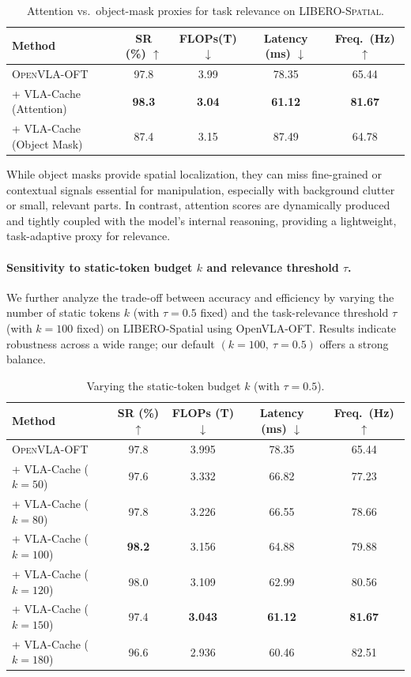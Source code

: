 \begin{table}[h]
\centering
\setlength{\tabcolsep}{8pt}
\begin{tabular}{lcccc}
\toprule
Method & SR (\%) $\uparrow$ & FLOPs(T) $\downarrow$ & Latency (ms) $\downarrow$ & Freq.\ (Hz) $\uparrow$ \\
\midrule
\textsc{OpenVLA-OFT} & 97.8 & 3.99 & 78.35 & 65.44 \\
\quad + VLA-Cache (Attention) & \textbf{98.3} & \textbf{3.04} & \textbf{61.12} & \textbf{81.67} \\
\quad + VLA-Cache (Object Mask) & 87.4 & 3.15 & 87.49 & 64.78 \\
\bottomrule
\end{tabular}   
\caption{Attention vs.\ object-mask proxies for task relevance on \textsc{LIBERO-Spatial}.}
\label{tab:attn_vs_mask}
\end{table}

While object masks provide spatial localization, they can miss fine-grained or contextual signals essential for manipulation, especially with background clutter or small, relevant parts. In contrast, attention scores are dynamically produced and tightly coupled with the model’s internal reasoning, providing a lightweight, task-adaptive proxy for relevance.

\paragraph{Sensitivity to static-token budget $k$ and relevance threshold $\tau$.}
We further analyze the trade-off between accuracy and efficiency by varying the number of static tokens $k$ (with $\tau{=}0.5$ fixed) and the task-relevance threshold $\tau$ (with $k{=}100$ fixed) on LIBERO-Spatial using OpenVLA-OFT. Results indicate robustness across a wide range; our default $(k{=}100,\ \tau{=}0.5)$ offers a strong balance.

\begin{table}[h]
\centering
\setlength{\tabcolsep}{8pt}
\begin{tabular}{lcccc}
\toprule
Method & SR (\%) $\uparrow$ & FLOPs (T) $\downarrow$ & Latency (ms) $\downarrow$ & Freq.\ (Hz) $\uparrow$ \\
\midrule
\textsc{OpenVLA-OFT} & 97.8 & 3.995 & 78.35 & 65.44 \\
\quad + VLA-Cache ($k{=}50$)  & 97.6 & 3.332 & 66.82 & 77.23 \\
\quad + VLA-Cache ($k{=}80$)  & 97.8 & 3.226 & 66.55 & 78.66 \\
\quad + VLA-Cache ($k{=}100$) & \textbf{98.2} & 3.156 & 64.88 & 79.88 \\
\quad + VLA-Cache ($k{=}120$) & 98.0 & 3.109 & 62.99 & 80.56 \\
\quad + VLA-Cache ($k{=}150$) & 97.4 & \textbf{3.043} & \textbf{61.12} & \textbf{81.67} \\
\quad + VLA-Cache ($k{=}180$) & 96.6 & 2.936 & 60.46 & 82.51 \\
\bottomrule
\end{tabular}
\caption{Varying the static-token budget $k$ (with $\tau{=}0.5$).}
\label{tab:k_sweep}
\end{table}

